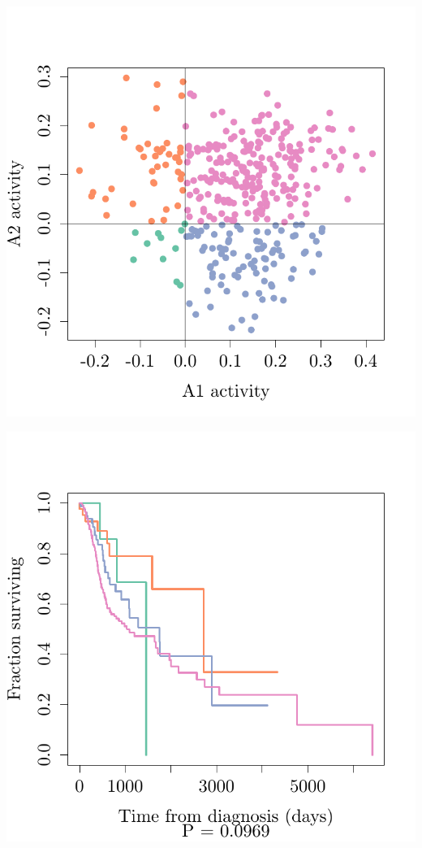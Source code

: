 \documentclass{article}\usepackage[]{graphicx}\usepackage[]{color}
\makeatletter
\def\maxwidth{ %
  \ifdim\Gin@nat@width>\linewidth
    \linewidth
  \else
    \Gin@nat@width
  \fi
}
\newenvironment{knitrout}{}{} %
\makeatother
\begin{document}
\begin{knitrout}
{\centering \includegraphics[width=\maxwidth]{figure/km-curves-7} 

}




{\centering \includegraphics[width=\maxwidth]{figure/km-curves-8} 

}
\end{knitrout}
\end{document}
